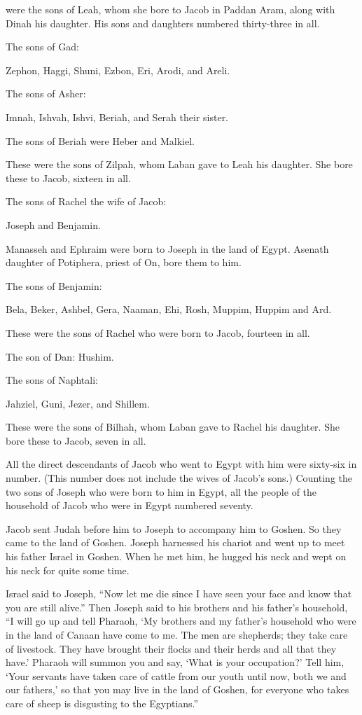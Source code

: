 {were the sons
of Leah,
whom
she bore
to Jacob
in Paddan Aram,
along with
Dinah
his daughter.
His sons
and daughters
numbered thirty-three
in all.
\par }{\Q {}The sons
of Gad:
\par }{\Q Zephon,
Haggi,
Shuni,
Ezbon,
Eri,
Arodi,
and Areli.
\par }{\Q {}The sons
of Asher:
\par }{\Q Imnah,
Ishvah,
Ishvi,
Beriah,
and Serah
their sister.
\par }{\Q The sons
of Beriah
were Heber
and Malkiel.
\par }{\Q {}These
were the sons
of Zilpah,
whom
Laban
gave
to Leah
his daughter.
She bore
these
to Jacob,
sixteen in all.
\par }{\Q {}The sons
of Rachel
the wife
of Jacob:
\par }{\Q Joseph
and Benjamin.
\par }{\Q {}Manasseh
and Ephraim
were born
to Joseph
in the land
of Egypt.
Asenath
daughter
of Potiphera,
priest
of On,
bore them to him.
\par }{\Q {}The sons
of Benjamin:

\par }{\Q Bela,
Beker,
Ashbel,
Gera,
Naaman,
Ehi,
Rosh,
Muppim,
Huppim
and Ard.
\par }{\Q {}These
were the sons
of Rachel
who
were born
to Jacob,
fourteen
in all.
\par }{\Q {}The son
of Dan: Hushim.
\par }{\Q {}The sons
of Naphtali:
\par }{\Q Jahziel,
Guni,
Jezer,
and Shillem.
\par }{\Q {}These
were the sons
of Bilhah,
whom
Laban
gave
to Rachel
his daughter.
She bore
these
to Jacob,
seven
in all.
\par }{\PP {}All
the direct
descendants of Jacob
who
went
to Egypt
with him were sixty-six
in number. (This number does not include
the wives
of Jacob’s
sons.)
Counting the two
sons
of Joseph
who
were born
to him in Egypt,
all
the people
of the household
of Jacob
who were
in Egypt
numbered seventy.
\par }{\PP {}Jacob sent
Judah
before
him to
Joseph
to accompany him
to Goshen.
So they came
to the land
of Goshen.
Joseph
harnessed
his chariot
and went up
to meet
his father
Israel
in Goshen.
When he met him, he hugged
his neck
and wept
on
his neck
for quite some time.
\par }{\PP {}Israel
said
to
Joseph,
“Now let me die
since
I have seen
your face
and know that
you are still
alive.”
Then Joseph
said to
his brothers
and his father’s
household,
“I will go up
and tell
Pharaoh, ‘My brothers
and my father’s
household
who
were in the land
of Canaan
have come
to me.
The men
are shepherds;
they take care of livestock.
They have brought
their flocks
and their herds
and all
that they have.’
Pharaoh
will
summon
you and say,
‘What
is your occupation?’
Tell
him, ‘Your servants
have taken care
of cattle
from our youth
until
now,
both
we
and our fathers,’
so that you may
live
in the land
of Goshen,
for
everyone
who takes care
of sheep
is disgusting
to the Egyptians.”

}
